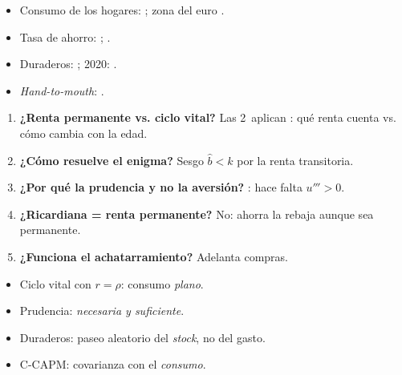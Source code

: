 \documentclass{article}
\begin{document}
\begin{columnas}
\anexorepaso
{}
\begin{itemize}
\item Consumo de los hogares: ; zona del euro .
\item Tasa de ahorro: ; .
\item Duraderos: ; 2020: .
\item \emph{Hand-to-mouth}: .
\end{itemize}
\begin{enumerate}
\item \textbf{¿Renta permanente vs. ciclo vital?} Las 2~aplican : qué renta cuenta vs. cómo cambia con la edad.
\item \textbf{¿Cómo resuelve  el enigma?} Sesgo $\hat b<k$ por la renta transitoria.
\item \textbf{¿Por qué la prudencia y no la aversión?} : hace falta $u'''>0$.
\item \textbf{¿Ricardiana = renta permanente?} No:  ahorra la rebaja aunque sea permanente.
\item \textbf{¿Funciona el achatarramiento?} Adelanta compras.
\end{enumerate}
\begin{trampa}
\begin{itemize}
\item Ciclo vital con $r=\rho$: consumo \emph{plano}.
\item Prudencia: \emph{necesaria y suficiente}.
\item Duraderos: paseo aleatorio del \emph{stock}, no del gasto.
\item C-CAPM: covarianza con el \emph{consumo}.
\end{itemize}
\end{trampa}

\end{columnas}
\end{document}
